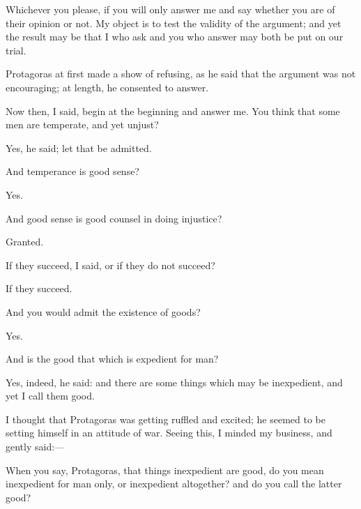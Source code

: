 \documentclass[11pt,letter]{article}
\begin{document}
\par  Whichever you please, if you will only answer me and say whether you are of their opinion or not. My object is to test the validity of the argument; and yet the result may be that I who ask and you who answer may both be put on our trial.

\par  Protagoras at first made a show of refusing, as he said that the argument was not encouraging; at length, he consented to answer.

\par  Now then, I said, begin at the beginning and answer me. You think that some men are temperate, and yet unjust?

\par  Yes, he said; let that be admitted.

\par  And temperance is good sense?

\par  Yes.

\par  And good sense is good counsel in doing injustice?

\par  Granted.

\par  If they succeed, I said, or if they do not succeed?

\par  If they succeed.

\par  And you would admit the existence of goods?

\par  Yes.

\par  And is the good that which is expedient for man?

\par  Yes, indeed, he said: and there are some things which may be inexpedient, and yet I call them good.

\par  I thought that Protagoras was getting ruffled and excited; he seemed to be setting himself in an attitude of war. Seeing this, I minded my business, and gently said:—

\par  When you say, Protagoras, that things inexpedient are good, do you mean inexpedient for man only, or inexpedient altogether? and do you call the latter good?
\end{document}
